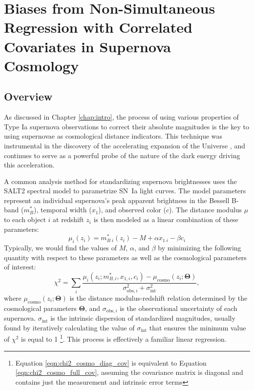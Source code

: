 \chapter{Biases from Non-Simultaneous Regression with Correlated Covariates in Supernova Cosmology}
\label{chap:reg_bias}

\newcommand{\sgn}{\text{sgn}}
\newcommand{\sigint}{\sigma_{\text{int}}}

\section{Overview} \label{sec:intro}
As discussed in Chapter \ref{chap:intro}, the process of using various properties of Type Ia supernova observations to correct their absolute magnitudes is the key to using supernovae as cosmological distance indicators. This technique was instrumental in the discovery of the accelerating expansion of the Universe \citep{perlmutter_measurements_1999, riess_observational_1998}, and continues to serve as a powerful probe of the nature of the dark energy driving this acceleration.

A common analysis method for standardizing supernova brightnesses uses the SALT2 spectral model \citep{guy_salt2_2007, betoule_improved_2014, mosher_cosmological_2014} to parametrize SN~Ia light curves. The model parameters represent an individual supernova's peak apparent brightness in the Bessell B-band ($m_B^*$), temporal width ($x_1$), and observed color ($c$). The distance modulus $\mu$ to each object $i$ at redshift $z_i$ is then modeled as a linear combination of these parameters:
\begin{equation}
    \mu_i(z_i) = m_{B\;i}^*(z_i) - M + \alpha x_{1\;i} - \beta c_i
\end{equation}
Typically, we would find the values of $M$, $\alpha$, and $\beta$ by minimizing the following quantity with respect to these parameters as well as the cosmological parameters of interest:
\begin{equation}
    \chi^2 = \displaystyle\sum_{i} \frac{\mu_i(z_i; m_{B, i}^*, x_{1,i}, c_i)-\mu_\text{cosmo}(z_i; \bm{\Theta})}{\sigma_{\text{obs},i}^2+\sigint^2},
    \label{eqn:chi2_cosmo_diag_cov}
\end{equation}
where $\mu_\text{cosmo}(z_i;\bm{\Theta})$ is the distance modulus-redshift relation determined by the cosmological parameters $\bm{\Theta}$, and $\sigma_{\text{obs},i}$ is the observational uncertainty of each supernova. $\sigma_\text{int}$ is the intrinsic dispersion of standardized magnitudes, usually found by iteratively calculating the value of $\sigint$ that ensures the minimum value of $\chi^2$ is equal to 1 \footnote{Equation \ref{eqn:chi2_cosmo_diag_cov} is equivalent to Equation \ref{eqn:chi2_cosmo_full_cov}, assuming the covariance matrix is diagonal and contains just the measurement and intrinsic error terms}. This process is effectively a familiar linear regression.

